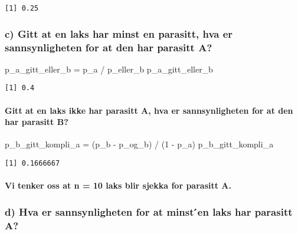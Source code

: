 \documentclass[
  12pt,
  a4paper,
  DIV=11,
  numbers=noendperiod]{scrartcl}
\let\oldparagraph\paragraph
\renewcommand{\paragraph}[1]{\oldparagraph{#1}\mbox{}}
\newenvironment{Shaded}{\begin{snugshade}}{\end{snugshade}}
\newcommand{\DecValTok}[1]{\textcolor[rgb]{0.68,0.00,0.00}{#1}}
\newcommand{\NormalTok}[1]{\textcolor[rgb]{0.00,0.23,0.31}{#1}}
\newcommand{\OtherTok}[1]{\textcolor[rgb]{0.00,0.23,0.31}{#1}}
\newcommand{\SpecialCharTok}[1]{\textcolor[rgb]{0.37,0.37,0.37}{#1}}
\begin{document}
\begin{verbatim}
[1] 0.25
\end{verbatim}

\subsubsection{c) Gitt at en laks har minst en parasitt, hva er
sannsynligheten for at den har parasitt
A?}\label{c-gitt-at-en-laks-har-minst-en-parasitt-hva-er-sannsynligheten-for-at-den-har-parasitt-a}

\begin{Shaded}
\begin{Highlighting}[]
\NormalTok{p\_a\_gitt\_eller\_b }\OtherTok{=}\NormalTok{ p\_a }\SpecialCharTok{/}\NormalTok{ p\_eller\_b}
\NormalTok{p\_a\_gitt\_eller\_b}
\end{Highlighting}
\end{Shaded}

\begin{verbatim}
[1] 0.4
\end{verbatim}

\paragraph{Gitt at en laks ikke har parasitt A, hva er sannsynligheten
for at den har parasitt
B?}\label{gitt-at-en-laks-ikke-har-parasitt-a-hva-er-sannsynligheten-for-at-den-har-parasitt-b}

\begin{Shaded}
\begin{Highlighting}[]
\NormalTok{p\_b\_gitt\_kompli\_a }\OtherTok{=}\NormalTok{ (p\_b }\SpecialCharTok{{-}}\NormalTok{ p\_og\_b) }\SpecialCharTok{/}\NormalTok{ (}\DecValTok{1} \SpecialCharTok{{-}}\NormalTok{ p\_a)}
\NormalTok{p\_b\_gitt\_kompli\_a}
\end{Highlighting}
\end{Shaded}

\begin{verbatim}
[1] 0.1666667
\end{verbatim}

\paragraph{Vi tenker oss at n = 10 laks blir sjekka for parasitt
A.}\label{vi-tenker-oss-at-n-10-laks-blir-sjekka-for-parasitt-a.}

\subsubsection{d) Hva er sannsynligheten for at minst ́en laks har
parasitt
A?}\label{d-hva-er-sannsynligheten-for-at-minst-en-laks-har-parasitt-a}
\end{document}
